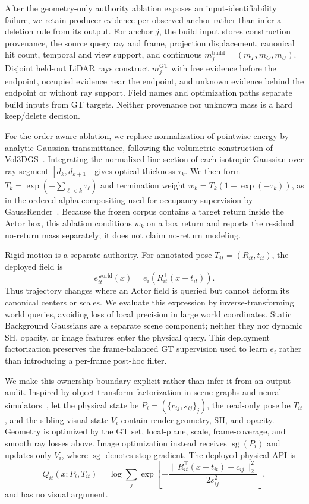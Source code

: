 After the geometry-only authority ablation exposes an input-identifiability failure, we retain producer evidence per observed
anchor rather than infer a deletion rule from its output. For anchor $j$, the build input stores construction provenance,
the source query ray and frame, projection displacement, canonical hit count, temporal and view support, and continuous
$m^{\mathrm{build}}_j=(m_F,m_O,m_U)$. Disjoint held-out LiDAR rays construct
$m^{\mathrm{GT}}_j$ with free evidence before the endpoint, occupied evidence near the endpoint, and unknown evidence
behind the endpoint or without ray support. Field names and optimization paths separate build inputs from GT targets.
Neither provenance nor unknown mass is a hard keep/delete decision.

For the order-aware ablation, we replace normalization of pointwise energy by analytic Gaussian transmittance, following
the volumetric construction of Vol3DGS~\cite{talegaonkar2025vol3dgs}. Integrating the normalized line section of each
isotropic Gaussian over ray segment $[d_k,d_{k+1}]$ gives optical thickness $\tau_k$. We then form
$T_k=\exp(-\sum_{\ell<k}\tau_\ell)$ and termination weight $w_k=T_k(1-\exp(-\tau_k))$, as in the ordered
alpha-compositing used for occupancy supervision by GaussRender~\cite{chambon2025gaussrender}. Because the frozen corpus
contains a target return inside the Actor box, this ablation conditions $w_k$ on a box return and reports the residual
no-return mass separately; it does not claim no-return modeling.

Rigid motion is a separate authority. For annotated pose $T_{it}=(R_{it},t_{it})$, the deployed field is
\begin{equation}
e_{it}^{\mathrm{world}}(x)=e_i\!\left(R_{it}^{\top}(x-t_{it})\right).
\end{equation}
Thus trajectory changes where an Actor field is queried but cannot deform its canonical centers or scales. We evaluate this expression by inverse-transforming world queries, avoiding loss of local precision in large world coordinates. Static Background Gaussians are a separate scene component; neither they nor dynamic SH, opacity, or image features enter the physical query. This deployment factorization preserves the frame-balanced GT supervision used to learn $e_i$ rather than introducing a per-frame post-hoc filter.

We make this ownership boundary explicit rather than infer it from an output audit. Inspired by object-transform factorization in scene graphs and neural simulators~\cite{ost2021neural,yang2023unisim}, let the physical state be $P_i=(\{c_{ij},s_{ij}\}_j)$, the read-only pose be $T_{it}$, and the sibling visual state $V_i$ contain render geometry, SH, and opacity. Geometry is optimized by the GT set, local-plane, scale, frame-coverage, and smooth ray losses above. Image optimization instead receives $\operatorname{sg}(P_i)$ and updates only $V_i$, where $\operatorname{sg}$ denotes stop-gradient. The deployed physical API is
\begin{equation}
Q_{it}(x;P_i,T_{it})=\log\sum_j\exp\!\left[-\frac{\|R_{it}^{\top}(x-t_{it})-c_{ij}\|_2^2}{2s_{ij}^2}\right],
\label{eq:authority-query}
\end{equation}
and has no visual argument.

